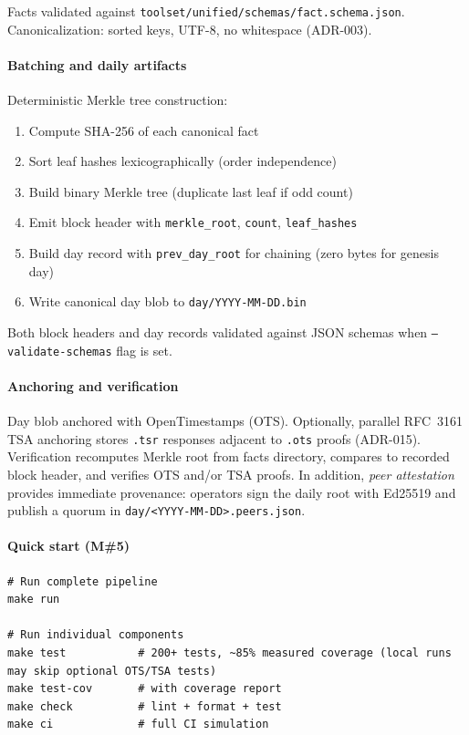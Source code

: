 Facts validated against \texttt{toolset/unified/schemas/fact.schema.json}.
Canonicalization: sorted keys, UTF-8, no whitespace (ADR-003).

\paragraph{Batching and daily artifacts}
Deterministic Merkle tree construction:
\begin{enumerate}[nosep]
    \item Compute SHA-256 of each canonical fact
    \item Sort leaf hashes lexicographically (order independence)
    \item Build binary Merkle tree (duplicate last leaf if odd count)
    \item Emit block header with \texttt{merkle\_root}, \texttt{count}, \texttt{leaf\_hashes}
    \item Build day record with \texttt{prev\_day\_root} for chaining (zero bytes for genesis day)
    \item Write canonical day blob to \texttt{day/YYYY-MM-DD.bin}
\end{enumerate}

Both block headers and day records validated against JSON schemas when \texttt{--validate-schemas} flag is set.

\paragraph{Anchoring and verification}
Day blob anchored with OpenTimestamps (OTS). Optionally, parallel RFC~3161 TSA anchoring stores \texttt{.tsr} responses adjacent to \texttt{.ots} proofs (ADR-015).
Verification recomputes Merkle root from facts directory, compares to recorded block header, and verifies OTS and/or TSA proofs. In addition, \emph{peer attestation} provides immediate provenance: operators sign the daily root with Ed25519 and publish a quorum in \texttt{day/<YYYY-MM-DD>.peers.json}.

\paragraph{Quick start (M\#5)}
\begin{verbatim}
# Run complete pipeline
make run

# Run individual components
make test           # 200+ tests, ~85% measured coverage (local runs may skip optional OTS/TSA tests)
make test-cov       # with coverage report
make check          # lint + format + test
make ci             # full CI simulation
\end{verbatim}

